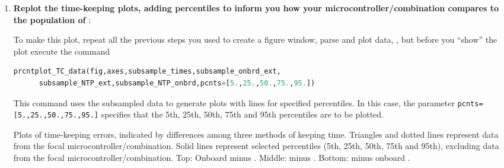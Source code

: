 \begin{enumerate}
	\item \textbf{Replot the time-keeping plots, adding percentiles to inform you how your microcontroller/\rtc combination compares to the population of \rtcs}:
	
	To make this plot, repeat all the previous steps you used to create a figure window, parse and plot data, \etc, but before you ``show'' the plot execute the command
\begin{lstlisting}[language=Python]
prcntplot_TC_data(fig,axes,subsample_times,subsample_onbrd_ext,
      subsample_NTP_ext,subsample_NTP_onbrd,pcnts=[5.,25.,50.,75.,95.])
\end{lstlisting}
	This command uses the subsampled data to generate plots with lines for specified percentiles.
	In this case, the parameter \lstinline{pcnts=[5.,25.,50.,75.,95.]} specifies that the 5th, 25th, 50th, 75th and 95th percentiles are to be plotted.
	\begin{marginfigure}[-19.cm]
	\begin{center}
		\caption[Plots of time-keeping errors]{Plots of time-keeping errors, indicated by differences among three methods of keeping time. 
		Triangles and dotted lines represent data from the focal microcontroller/\rtc combination. 
		Solid lines represent selected percentiles (5th, 25th, 50th, 75th and 95th), excluding data from the focal microcontroller/\rtc combination. 
		Top: Onboard \rtc minus  \rtc. Middle: \ntp minus  \rtc. Bottom: \ntp minus onboard \rtc. }
	\end{center}
\end{marginfigure}


\end{enumerate}
